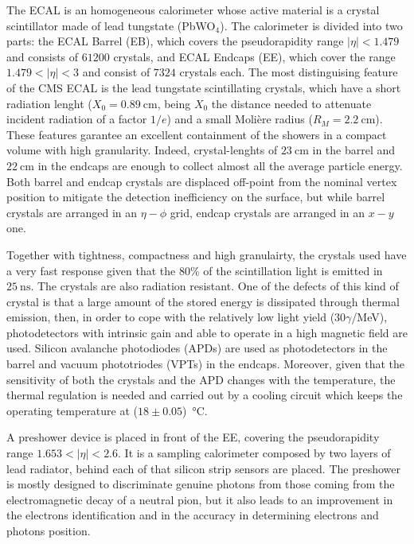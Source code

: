 The ECAL is an homogeneous calorimeter whose active material is a crystal scintillator 
made of lead tungstate (PbWO$_4$). The calorimeter is divided into two parts: 
the ECAL Barrel (EB), which covers the pseudorapidity range $|\eta|< 1.479$
and consists of $61200$ crystals, and ECAL Endcaps (EE), which cover the range $1.479<|\eta|<3$ and consist of $7324$ crystals each.
The most distinguising feature of the CMS ECAL is the lead tungstate scintillating crystals, which
have a short radiation lenght ($X_0=0.89~\si{\cm}$, being $X_0$ the distance needed to attenuate incident 
radiation of a factor $1/e$) and a small Moli\`ere radius ($R_M=2.2~\si{\cm}$). These
features garantee an excellent containment of the showers in a compact volume with high granularity.
Indeed, crystal-lenghts of $23~\si{\cm}$ in the barrel and $22~\si{\cm}$ in the endcaps are enough
to collect almost all the average particle energy. Both barrel and endcap crystals are
displaced off-point from the nominal vertex position to mitigate the detection inefficiency
on the surface, but while barrel crystals are arranged in an $\eta-\phi$ grid, endcap crystals are arranged in an $x-y$ one.

Together with tightness, compactness and high granulairty, the crystals used have a very fast response
given that the 80\% of the scintillation light is emitted in $25~\si{\ns}$. The crystals are also radiation resistant. 
One of the defects of this kind of crystal is that a large amount
of the stored energy is dissipated through thermal emission, then, in order to cope with the relatively low light yield 
($30\gamma$/\si{\MeV}), photodetectors with intrinsic gain and able to operate in a high magnetic field are used.
Silicon avalanche photodiodes (APDs) are used as photodetectors in the barrel and
vacuum phototriodes (VPTs) in the endcaps. Moreover, given that the sensitivity of both the crystals
and the APD changes with the temperature, the thermal regulation is needed and carried out by a cooling circuit which 
keeps the operating temperature at ($18\pm0.05$)~\si{\degreeCelsius}. 

A preshower device is placed in front of the EE, covering the pseudorapidity range 
$1.653<|\eta|<2.6$. It is a sampling calorimeter composed by two layers of
lead radiator, behind each of that silicon strip sensors are placed.
The preshower is mostly designed to discriminate genuine photons from those
coming from the electromagnetic decay of a neutral pion, but it also leads to an improvement in the 
electrons identification and in the accuracy in determining electrons and photons position.

